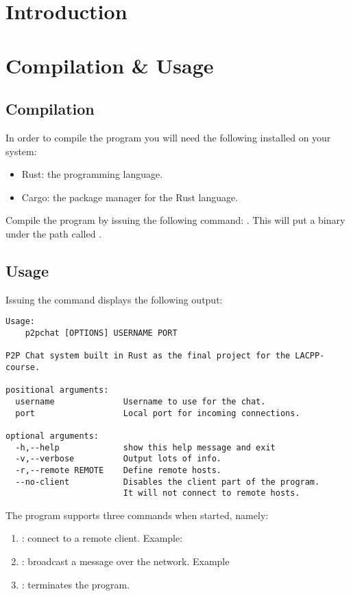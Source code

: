 \section{Introduction}

\section{Compilation \& Usage}
\subsection{Compilation}
In order to compile the program you will need the following installed on your system:
\begin{itemize}
  \item Rust: the programming language.
  \item Cargo: the package manager for the Rust language.
\end{itemize}

\noindent Compile the program by issuing the following command: . This will put a binary under the path  called .

\subsection{Usage}
Issuing the command  displays the following output:
\begin{lstlisting}
Usage:
    p2pchat [OPTIONS] USERNAME PORT

P2P Chat system built in Rust as the final project for the LACPP-course.

positional arguments:
  username              Username to use for the chat.
  port                  Local port for incoming connections.

optional arguments:
  -h,--help             show this help message and exit
  -v,--verbose          Output lots of info.
  -r,--remote REMOTE    Define remote hosts.
  --no-client           Disables the client part of the program.
                        It will not connect to remote hosts.
\end{lstlisting}

\noindent The program supports three commands when started, namely:
\begin{enumerate}
  \item {}: connect to a remote client. Example: 
  \item {}: broadcast a message over the network. Example 
  \item {}: terminates the program.
\end{enumerate}

